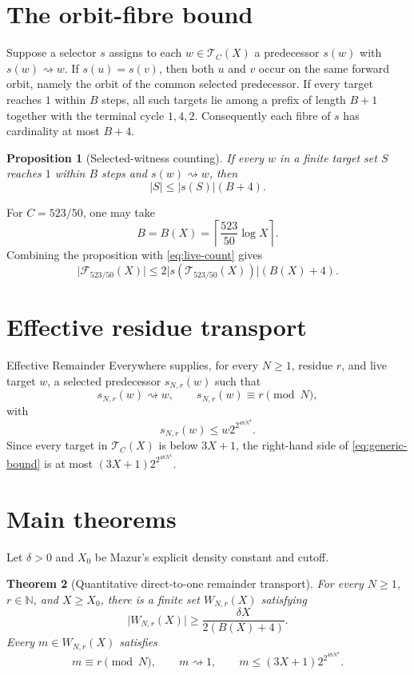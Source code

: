 \documentclass[11pt]{article}
\newtheorem{theorem}{Theorem}[section]
\newtheorem{proposition}[theorem]{Proposition}
\theoremstyle{definition}
\theoremstyle{remark}
\newcommand{\N}{\mathbb N}
\newcommand{\Reach}{\rightsquigarrow}
\newcommand{\card}[1]{\lvert #1\rvert}
\begin{document}
\section{The orbit-fibre bound}
Suppose a selector $s$ assigns to each $w\in\mathcal T_C(X)$ a predecessor
$s(w)$ with $s(w)\Reach w$.  If $s(u)=s(v)$, then both $u$ and $v$ occur on
the same forward orbit, namely the orbit of the common selected predecessor.
If every target reaches $1$ within $B$ steps, all such targets lie among a
prefix of length $B+1$ together with the terminal cycle $1,4,2$.  Consequently
each fibre of $s$ has cardinality at most $B+4$.

\begin{proposition}[Selected-witness counting]
If every $w$ in a finite target set $S$ reaches $1$ within $B$ steps and
$s(w)\Reach w$, then
\[
 \card S\le \card{s(S)}(B+4).
\]
\end{proposition}

For $C=523/50$, one may take
\[
 B=B(X)=\left\lceil\frac{523}{50}\log X\right\rceil.
\]
Combining the proposition with \eqref{eq:live-count} gives
\begin{equation}\label{eq:collision}
 \card{\mathcal F_{523/50}(X)}
 \le2\card{s(\mathcal T_{523/50}(X))}(B(X)+4).
\end{equation}

\section{Effective residue transport}
Effective Remainder Everywhere supplies, for every $N\ge1$, residue $r$, and
live target $w$, a selected predecessor $s_{N,r}(w)$ such that
\[
 s_{N,r}(w)\Reach w,\qquad s_{N,r}(w)\equiv r\pmod N,
\]
with
\begin{equation}\label{eq:generic-bound}
 s_{N,r}(w)\le w2^{2^{48N^4}}.
\end{equation}
Since every target in $\mathcal T_C(X)$ is below $3X+1$, the right-hand side
of \eqref{eq:generic-bound} is at most
$(3X+1)2^{2^{48N^4}}$.

\section{Main theorems}
Let $\delta>0$ and $X_0$ be Mazur's explicit density constant and cutoff.

\begin{theorem}[Quantitative direct-to-one remainder transport]
For every $N\ge1$, $r\in\N$, and $X\ge X_0$, there is a finite set
$W_{N,r}(X)$ satisfying
\[
 \card{W_{N,r}(X)}\ge
 \frac{\delta X}{2(B(X)+4)}.
\]
Every $m\in W_{N,r}(X)$ satisfies
\[
 m\equiv r\pmod N,\qquad m\Reach1,
 \qquad m\le(3X+1)2^{2^{48N^4}}.
\]
\end{theorem}
\end{document}
